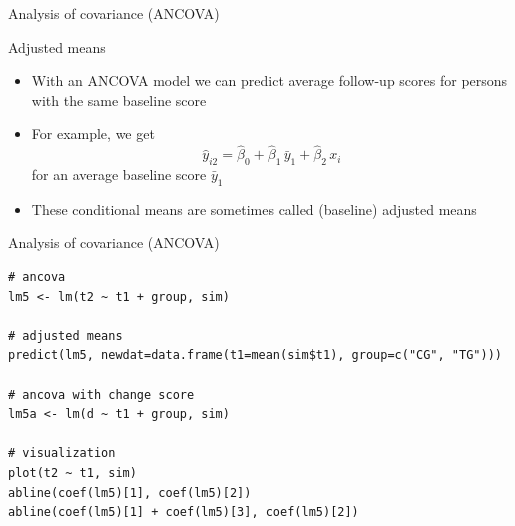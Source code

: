 \documentclass[aspectratio=169]{beamer}
\begin{document}
\begin{frame}{Analysis of covariance (ANCOVA)}
\begin{center}
\end{center}
\end{frame}


\begin{frame}{Adjusted means}
\begin{itemize}
  \item With an ANCOVA model we can predict average follow-up scores for
    persons with the same baseline score
  \item For example, we get
    \[
      \hat{y}_{i2} = \hat{\beta}_0 + \hat{\beta}_1 \, \bar{y}_1 +
                     \hat{\beta}_2 \, x_i
    \]
    for an average baseline score $\bar{y}_1$
\item These conditional means are sometimes called (baseline) adjusted
  means
\end{itemize}
\end{frame}

\begin{frame}[fragile]{Analysis of covariance (ANCOVA)}
\begin{lstlisting}
# ancova
lm5 <- lm(t2 ~ t1 + group, sim)

# adjusted means
predict(lm5, newdat=data.frame(t1=mean(sim$t1), group=c("CG", "TG")))

# ancova with change score
lm5a <- lm(d ~ t1 + group, sim)

# visualization
plot(t2 ~ t1, sim)
abline(coef(lm5)[1], coef(lm5)[2])
abline(coef(lm5)[1] + coef(lm5)[3], coef(lm5)[2])
\end{lstlisting}
\end{frame}
\end{document}
